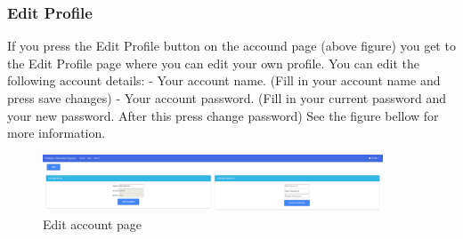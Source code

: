 \documentclass[a4paper]{article}
\begin{document}
\subsubsection{Edit Profile}
If you press the Edit Profile button on the accound page (above figure) you get to the Edit Profile page where you can edit your own profile.
\newline
\newline
You can edit the following account details:
\newline
- Your account name. (Fill in your account name and press save changes)
\newline
- Your account password. (Fill in your current password and your new password. After this press change password)
\newline
See the figure bellow for more information.
\newline
\newline
\begin{figure}[h!]
  \caption{Edit account page}
  \centering
  \includegraphics[width=0.9\textwidth]{edit-account}
\end{figure}
\newline


\newpage
\end{document}
